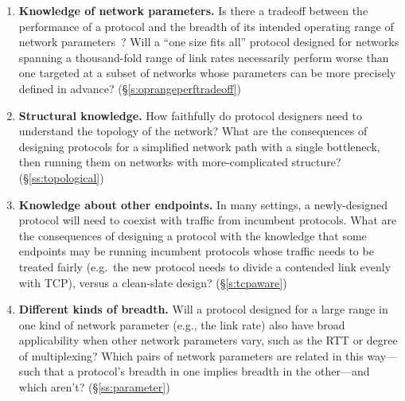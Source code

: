 \begin{enumerate}

\item \textbf{Knowledge of network parameters.} Is there a tradeoff
  between the performance of a protocol and the breadth of its
  intended operating range of network parameters~\cite{wroclawski}?
  Will a ``one size fits all'' protocol designed for networks spanning
  a thousand-fold range of link rates necessarily perform worse than
  one targeted at a subset of networks whose parameters can be more
  precisely defined in advance?  (\S\ref{s:oprangeperftradeoff})

\item \textbf{Structural knowledge.} How faithfully do protocol
  designers need to understand the topology of the network? What are
  the consequences of designing protocols for a simplified network
  path with a single bottleneck, then running them on networks with
  more-complicated structure?  (\S\ref{ss:topological})

\item \textbf{Knowledge about other endpoints.} In many settings, a
  newly-designed protocol will need to coexist with traffic from
  incumbent protocols. What are the consequences of designing a
  protocol with the knowledge that some endpoints may be running
  incumbent protocols whose traffic needs to be treated fairly
  (e.g.~the new protocol needs to divide a contended link evenly with
  TCP), versus a clean-slate design?  (\S\ref{s:tcpaware})

\item \textbf{Different kinds of breadth.} Will a protocol designed
  for a large range in one kind of network parameter (e.g., the link
  rate) also have broad applicability when other network parameters
  vary, such as the RTT or degree of multiplexing?  Which pairs of
  network parameters are related in this way---such that a protocol's
  breadth in one implies breadth in the other---and which aren't?
  (\S\ref{ss:parameter})


\end{enumerate}

